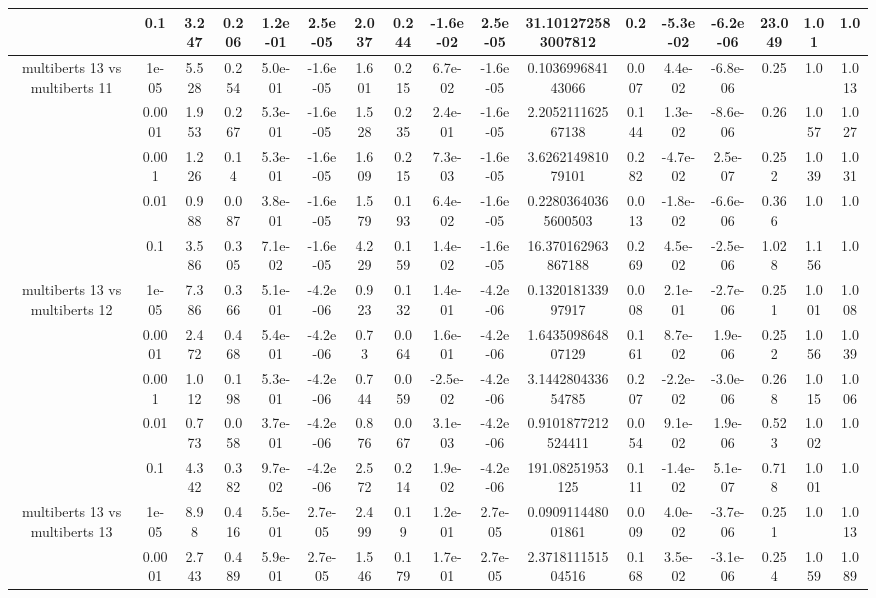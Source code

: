 \begin{tabular}{|c|c|c|c|c|c|c|c|c|c|c|c|c|c|c|c|c|}
 & 0.1 & 3.247 & 0.206 & 1.2e-01 & 2.5e-05 & 2.037 & 0.244 & -1.6e-02 & 2.5e-05 & 31.101272583007812 & 0.2 & -5.3e-02 & -6.2e-06 & 23.049 & 1.01 & 1.0 \\
\hline
\multirow{5}{*}{multiberts 13 vs multiberts 11} & 1e-05 & 5.528 & 0.254 & 5.0e-01 & -1.6e-05 & 1.601 & 0.215 & 6.7e-02 & -1.6e-05 & 0.103699684143066 & 0.007 & 4.4e-02 & -6.8e-06 & 0.25 & 1.0 & 1.013 \\
 & 0.0001 & 1.953 & 0.267 & 5.3e-01 & -1.6e-05 & 1.528 & 0.235 & 2.4e-01 & -1.6e-05 & 2.205211162567138 & 0.144 & 1.3e-02 & -8.6e-06 & 0.26 & 1.057 & 1.027 \\
 & 0.001 & 1.226 & 0.14 & 5.3e-01 & -1.6e-05 & 1.609 & 0.215 & 7.3e-03 & -1.6e-05 & 3.626214981079101 & 0.282 & -4.7e-02 & 2.5e-07 & 0.252 & 1.039 & 1.031 \\
 & 0.01 & 0.988 & 0.087 & 3.8e-01 & -1.6e-05 & 1.579 & 0.193 & 6.4e-02 & -1.6e-05 & 0.22803640365600503 & 0.013 & -1.8e-02 & -6.6e-06 & 0.366 & 1.0 & 1.0 \\
 & 0.1 & 3.586 & 0.305 & 7.1e-02 & -1.6e-05 & 4.229 & 0.159 & 1.4e-02 & -1.6e-05 & 16.370162963867188 & 0.269 & 4.5e-02 & -2.5e-06 & 1.028 & 1.156 & 1.0 \\
\hline
\multirow{5}{*}{multiberts 13 vs multiberts 12} & 1e-05 & 7.386 & 0.366 & 5.1e-01 & -4.2e-06 & 0.923 & 0.132 & 1.4e-01 & -4.2e-06 & 0.132018133997917 & 0.008 & 2.1e-01 & -2.7e-06 & 0.251 & 1.001 & 1.008 \\
 & 0.0001 & 2.472 & 0.468 & 5.4e-01 & -4.2e-06 & 0.73 & 0.064 & 1.6e-01 & -4.2e-06 & 1.643509864807129 & 0.161 & 8.7e-02 & 1.9e-06 & 0.252 & 1.056 & 1.039 \\
 & 0.001 & 1.012 & 0.198 & 5.3e-01 & -4.2e-06 & 0.744 & 0.059 & -2.5e-02 & -4.2e-06 & 3.144280433654785 & 0.207 & -2.2e-02 & -3.0e-06 & 0.268 & 1.015 & 1.006 \\
 & 0.01 & 0.773 & 0.058 & 3.7e-01 & -4.2e-06 & 0.876 & 0.067 & 3.1e-03 & -4.2e-06 & 0.9101877212524411 & 0.054 & 9.1e-02 & 1.9e-06 & 0.523 & 1.002 & 1.0 \\
 & 0.1 & 4.342 & 0.382 & 9.7e-02 & -4.2e-06 & 2.572 & 0.214 & 1.9e-02 & -4.2e-06 & 191.08251953125 & 0.111 & -1.4e-02 & 5.1e-07 & 0.718 & 1.001 & 1.0 \\
\hline
\multirow{5}{*}{multiberts 13 vs multiberts 13} & 1e-05 & 8.98 & 0.416 & 5.5e-01 & 2.7e-05 & 2.499 & 0.19 & 1.2e-01 & 2.7e-05 & 0.090911448001861 & 0.009 & 4.0e-02 & -3.7e-06 & 0.251 & 1.0 & 1.013 \\
 & 0.0001 & 2.743 & 0.489 & 5.9e-01 & 2.7e-05 & 1.546 & 0.179 & 1.7e-01 & 2.7e-05 & 2.371811151504516 & 0.168 & 3.5e-02 & -3.1e-06 & 0.254 & 1.059 & 1.089 \\

\end{tabular}

